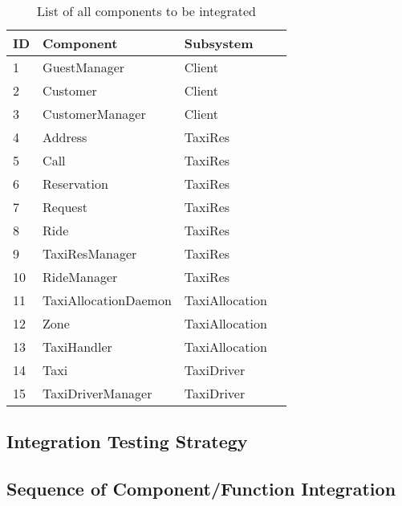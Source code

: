 \documentclass[a4paper, 11pt]{article}
\begin{document}
\begin{table}
    \centering
    \begin{tabular}{| l | l | p{} | p{} |}
    \hline
    \textbf{ID} & \textbf{Component} & \textbf{Subsystem} \\
    \hline
    1 & GuestManager & Client\\
    \hline
    2 & Customer & Client\\
    \hline
    3 & CustomerManager & Client\\
    \hline
    4 & Address & TaxiRes\\
    \hline
    5 & Call & TaxiRes\\
    \hline
    6 & Reservation & TaxiRes\\
    \hline
    7 & Request & TaxiRes\\
    \hline
    8 & Ride & TaxiRes\\
    \hline
    9 & TaxiResManager & TaxiRes\\
    \hline
    10 & RideManager & TaxiRes\\
    \hline
    11 & TaxiAllocationDaemon & TaxiAllocation\\
    \hline
    12 & Zone & TaxiAllocation\\
    \hline
    13 & TaxiHandler & TaxiAllocation\\
    \hline
    14 & Taxi & TaxiDriver\\
    \hline
    15 & TaxiDriverManager & TaxiDriver\\
    \hline
    \end{tabular}
    \caption{List of all components to be integrated}
    \label{tab:components-integration}
\end{table}

\subsection{Integration Testing Strategy} 
\label{sub:integration_testing_strategy}

\subsection{Sequence of Component/Function Integration} 
\label{sub:sequence_of_component_function_integration}
\end{document}
